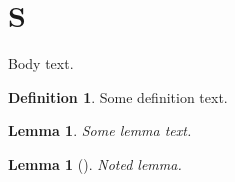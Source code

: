 \documentclass{acmart}
\theoremstyle{plain}
\newtheorem{lemma}[theorem]{Lemma}
\theoremstyle{definition}
\newtheorem{definition}[theorem]{Definition}
\begin{document}
\section{S}
Body text.
\begin{definition}\label{def:a} Some definition text.
\end{definition}

\begin{lemma}\label{lem:a} Some lemma text.
\end{lemma}

\begin{lemma}[{\cite[Lemma~3.1]{key}}]\label{lem:b} Noted lemma.
\end{lemma}
\end{document}
